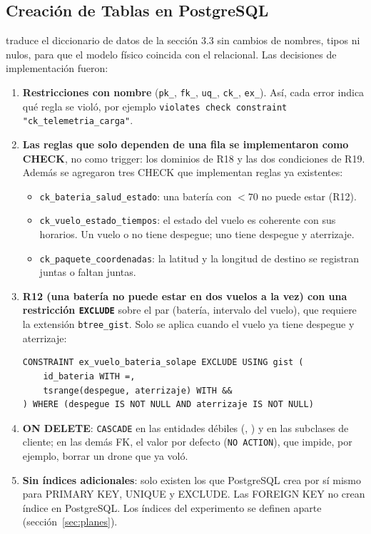 \subsection{Creación de Tablas en PostgreSQL}
\label{sec:tablas}

 traduce el diccionario de datos de la sección 3.3 sin cambios de nombres, tipos ni nulos, para que el modelo físico coincida con el relacional. Las decisiones de implementación fueron:

\begin{enumerate}[label=\arabic*.]
\item \textbf{Restricciones con nombre} (\texttt{pk\_}, \texttt{fk\_}, \texttt{uq\_}, \texttt{ck\_}, \texttt{ex\_}). Así, cada error indica qué regla se violó, por ejemplo \texttt{violates check constraint "ck\_telemetria\_carga"}.
\item \textbf{Las reglas que solo dependen de una fila se implementaron como CHECK}, no como trigger: los dominios de R18 y las dos condiciones de R19. Además se agregaron tres CHECK que implementan reglas ya existentes:
  \begin{itemize}
  \item \texttt{ck\_bateria\_salud\_estado}: una batería con  $< 70$ no puede estar  (R12).
  \item \texttt{ck\_vuelo\_estado\_tiempos}: el estado del vuelo es coherente con sus horarios. Un vuelo  o  no tiene despegue; uno  tiene despegue y aterrizaje.
  \item \texttt{ck\_paquete\_coordenadas}: la latitud y la longitud de destino se registran juntas o faltan juntas.
  \end{itemize}
\item \textbf{R12 (una batería no puede estar en dos vuelos a la vez) con una restricción \texttt{EXCLUDE}} sobre el par (batería, intervalo del vuelo), que requiere la extensión \texttt{btree\_gist}. Solo se aplica cuando el vuelo ya tiene despegue y aterrizaje:
\begin{lstlisting}[style=sql]
CONSTRAINT ex_vuelo_bateria_solape EXCLUDE USING gist (
    id_bateria WITH =,
    tsrange(despegue, aterrizaje) WITH &&
) WHERE (despegue IS NOT NULL AND aterrizaje IS NOT NULL)
\end{lstlisting}
\item \textbf{ON DELETE}: \texttt{CASCADE} en las entidades débiles (, ) y en las subclases de cliente; en las demás FK, el valor por defecto (\texttt{NO ACTION}), que impide, por ejemplo, borrar un drone que ya voló.
\item \textbf{Sin índices adicionales}: solo existen los que PostgreSQL crea por sí mismo para PRIMARY KEY, UNIQUE y EXCLUDE. Las FOREIGN KEY no crean índice en PostgreSQL. Los índices del experimento se definen aparte (sección~\ref{sec:planes}).
\end{enumerate}

